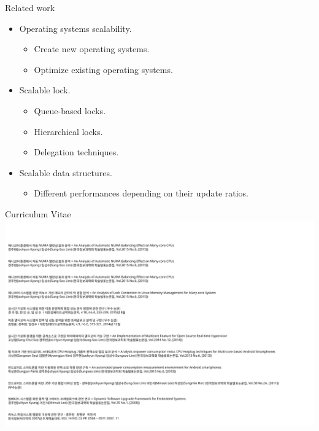 \documentclass[english]{beamer} %
\begin{document}
\begin{frame}{Related work}
\begin{itemize}
    \item Operating systems scalability.
    \begin{itemize}
    \item Create new operating systems.
    \item Optimize existing operating systems.
    \end{itemize}    
    \item Scalable lock.
    \begin{itemize}
    \item Queue-based locks.
    \item Hierarchical locks.
    \item Delegation techniques.
    \end{itemize}
    \item Scalable data structures.
    \begin{itemize}
    \item Different performances depending on their update ratios.
    \end{itemize}
    \end{itemize}
\end{frame}


\begin{frame}{Curriculum Vitae}
\includegraphics[scale=0.5]{cv/cv0}
\end{frame}
\end{document}
